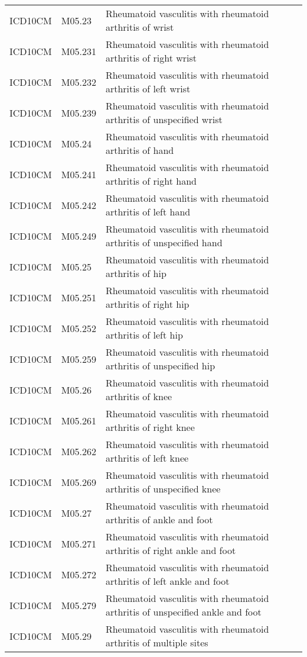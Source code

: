 \begin{longtable}{p{}p{}p{}}
  ICD10CM & M05.23 & Rheumatoid vasculitis with rheumatoid arthritis of wrist \\ 
  ICD10CM & M05.231 & Rheumatoid vasculitis with rheumatoid arthritis of right wrist \\ 
  ICD10CM & M05.232 & Rheumatoid vasculitis with rheumatoid arthritis of left wrist \\ 
  ICD10CM & M05.239 & Rheumatoid vasculitis with rheumatoid arthritis of unspecified wrist \\ 
  ICD10CM & M05.24 & Rheumatoid vasculitis with rheumatoid arthritis of hand \\ 
  ICD10CM & M05.241 & Rheumatoid vasculitis with rheumatoid arthritis of right hand \\ 
  ICD10CM & M05.242 & Rheumatoid vasculitis with rheumatoid arthritis of left hand \\ 
  ICD10CM & M05.249 & Rheumatoid vasculitis with rheumatoid arthritis of unspecified hand \\ 
  ICD10CM & M05.25 & Rheumatoid vasculitis with rheumatoid arthritis of hip \\ 
  ICD10CM & M05.251 & Rheumatoid vasculitis with rheumatoid arthritis of right hip \\ 
  ICD10CM & M05.252 & Rheumatoid vasculitis with rheumatoid arthritis of left hip \\ 
  ICD10CM & M05.259 & Rheumatoid vasculitis with rheumatoid arthritis of unspecified hip \\ 
  ICD10CM & M05.26 & Rheumatoid vasculitis with rheumatoid arthritis of knee \\ 
  ICD10CM & M05.261 & Rheumatoid vasculitis with rheumatoid arthritis of right knee \\ 
  ICD10CM & M05.262 & Rheumatoid vasculitis with rheumatoid arthritis of left knee \\ 
  ICD10CM & M05.269 & Rheumatoid vasculitis with rheumatoid arthritis of unspecified knee \\ 
  ICD10CM & M05.27 & Rheumatoid vasculitis with rheumatoid arthritis of ankle and foot \\ 
  ICD10CM & M05.271 & Rheumatoid vasculitis with rheumatoid arthritis of right ankle and foot \\ 
  ICD10CM & M05.272 & Rheumatoid vasculitis with rheumatoid arthritis of left ankle and foot \\ 
  ICD10CM & M05.279 & Rheumatoid vasculitis with rheumatoid arthritis of unspecified ankle and foot \\ 
  ICD10CM & M05.29 & Rheumatoid vasculitis with rheumatoid arthritis of multiple sites \\ 

\end{longtable}
